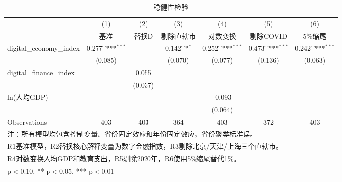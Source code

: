 \begin{table}[htbp]\centering
\def\sym#1{\ifmmode^{#1}\else\(^{#1}\)\fi}
\caption{稳健性检验\label{tab:robustness}}
\begin{tabular}{l*{6}{c}}
\toprule
                    &\multicolumn{1}{c}{(1)}&\multicolumn{1}{c}{(2)}&\multicolumn{1}{c}{(3)}&\multicolumn{1}{c}{(4)}&\multicolumn{1}{c}{(5)}&\multicolumn{1}{c}{(6)}\\
                    &\multicolumn{1}{c}{基准}&\multicolumn{1}{c}{替换D}&\multicolumn{1}{c}{剔除直辖市}&\multicolumn{1}{c}{对数变换}&\multicolumn{1}{c}{剔除COVID}&\multicolumn{1}{c}{5\%缩尾}\\
\midrule
digital\_economy\_index&       0.277\sym{***}&                     &       0.142\sym{*}  &       0.252\sym{***}&       0.473\sym{***}&       0.242\sym{***}\\
                    &     (0.085)         &                     &     (0.070)         &     (0.077)         &     (0.136)         &     (0.063)         \\
\addlinespace
digital\_finance\_index&                     &       0.055         &                     &                     &                     &                     \\
                    &                     &     (0.037)         &                     &                     &                     &                     \\
\addlinespace
ln(人均GDP)         &                     &                     &                     &      -0.093         &                     &                     \\
                    &                     &                     &                     &     (0.064)         &                     &                     \\
\midrule
Observations        &         403         &         403         &         364         &         403         &         372         &         403         \\
\bottomrule
\multicolumn{7}{l}{\footnotesize 注：所有模型均包含控制变量、省份固定效应和年份固定效应，省份聚类标准误。}\\
\multicolumn{7}{l}{\footnotesize R1基准模型，R2替换核心解释变量为数字金融指数，R3剔除北京/天津/上海三个直辖市。}\\
\multicolumn{7}{l}{\footnotesize R4对数变换人均GDP和教育支出，R5剔除2020年，R6使用5\%缩尾替代1\%。}\\
\multicolumn{7}{l}{\footnotesize * p$<$0.10, ** p$<$0.05, *** p$<$0.01}\\
\end{tabular}
\end{table}
